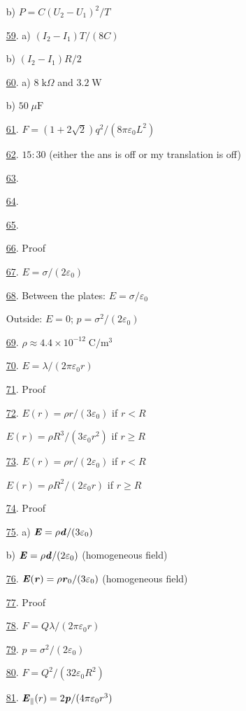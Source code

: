 \documentclass[11pt]{article}
\begin{document}
\begin{multicols}{2}
\begin{enumerate}
	b) $P=C(U_2-U_1)^2/T$ %
	\item [\hyperlink{P59}{59}.] a) $(I_2-I_1)T/(8C)$
	
	b) $(I_2-I_1)R/2$ %
	\item [\hyperlink{P60}{60}.] a) $8\;\text{k}\Omega$ and $3.2\;\text{W}$
	
	b) $50\;\mu\text{F}$ %
	\item [\hyperlink{P61}{61}.] $F=(1+2\sqrt{2})q^2/(8\pi\varepsilon_0 L^2)$ %
	\item [\hyperlink{P62}{62}.] $15:30$ (either the ans is off or my translation is off) %
	\item [\hyperlink{P63}{63}.]  %
	\item [\hyperlink{P64}{64}.]  %
	\item [\hyperlink{P65}{65}.]  %
	\item [\hyperlink{P66}{66}.] Proof %
	\item [\hyperlink{P67}{67}.] $E=\sigma/(2\varepsilon_0)$ %
	\item [\hyperlink{P68}{68}.] Between the plates: $E=\sigma/\varepsilon_0$
	
	Outside: $E=0$; $p=\sigma^2/(2\varepsilon_0)$ %
	\item [\hyperlink{P69}{69}.] $\rho\approx4.4\times10^{-12}\;\text{C}/\text{m}^3$ %
	\item [\hyperlink{P70}{70}.] $E=\lambda/(2\pi\varepsilon_0r)$ %
	\item [\hyperlink{P71}{71}.] Proof %
	\item [\hyperlink{P72}{72}.] $E(r)=\rho r/(3\varepsilon_0)$ if $r<R$
	
	$E(r)=\rho R^3/(3\varepsilon_0r^2)$ if $r\geq R$ %
	\item [\hyperlink{P73}{73}.] $E(r)=\rho r/(2\varepsilon_0)$ if $r<R$
	
	$E(r)=\rho R^2/(2\varepsilon_0r)$ if $r\geq R$ %
	\item [\hyperlink{P74}{74}.] Proof %
	\item [\hyperlink{P75}{75}.] a) $\textbf{\textit{E}}=\rho\textbf{\textit{d}}/(3\varepsilon_0)$
	
	b) $\textbf{\textit{E}}=\rho\textbf{\textit{d}}/(2\varepsilon_0)$ (homogeneous field) %
	\item [\hyperlink{P76}{76}.] $\textbf{\textit{E}}(\textbf{\textit{r}})=\rho\textbf{\textit{r}}_0/(3\varepsilon_0)$ (homogeneous field) %
	\item [\hyperlink{P77}{77}.] Proof %
	\item [\hyperlink{P78}{78}.] $F=Q\lambda/(2\pi\varepsilon_0 r)$ %
	\item [\hyperlink{P79}{79}.] $p=\sigma^2/(2\varepsilon_0)$ %
	\item [\hyperlink{P80}{80}.] $F=Q^2/(32\varepsilon_0R^2)$ %
	\item [\hyperlink{P81}{81}.] $\textbf{\textit{E}}_{\parallel}(r)=2\textbf{\textit{p}}/(4\pi\varepsilon_0r^3)$
	

\end{enumerate}
\end{multicols}
\end{document}
